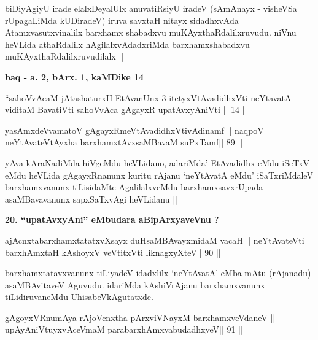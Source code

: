 \begin{artha}
biDiyAgiyU irade elalxDeyalUlx anuvatiRsiyU iradeV (sAmAnayx - visheVSa rUpagaLiMda kUDiradeV) iruva savxtaH nitayx sidadhxvAda Atamxvasutxvinalilx barxhamx shabadxvu muKAyxthaRdalilxruvudu. niVnu heVLida athaRdalilx hAgilalxvAdadxriMda barxhamxshabadxvu muKAyxthaRdalilxruvudilalx ||
\end{artha} 

\begin{center}
{\large\textbf{baq - a. 2, bArx. 1, kaMDike 14}}
\end{center}

\begin{shl}
``sahoVvAcaM jAtashaturxH EtAvanUnx 3 itetyxVtAvadidhxVti
neYtavatA viditaM BavatiVti sahoVvAca gAgayxR
upatAvxyAniVti || 14 ||
\end{shl}

\begin{shl}
yasAmxdeVvamatoV gAgayxRmeVtAvadidhxVtivAdinamf ||
naqpoV neYtAvateVtAyxha barxhamxtAvxsaMBavaM suPxTamf\hfill || 89 ||
\end{shl}

\begin{artha}
yAva kAraNadiMda hiVgeMdu heVLidano, adariMda' EtAvadidhx eMdu iSeTxV eMdu heVLida gAgayxRnanunx kuritu rAjanu `neYtAvatA eMdu' iSaTxriMdaleV barxhamxvanunx tiLisidaMte AgalilalxveMdu barxhamxsavxrUpada asaMBavavanunx sapxSaTxvAgi heVLidanu ||
\end{artha}

\begin{artha}
{\bf 20. ``upatAvxyAni'' eMbudara aBipArxyaveVnu ?}
\end{artha} 

\begin{shl}
ajAcnxtabarxhamxtatatxvXsayx duHsaMBAvayxmidaM vacaH ||
neYtAvateVti barxhAmxtaH kAshoyxV veVtitxVti liknagxyXteV\hfill || 90 ||
\end{shl}

\begin{artha}
barxhamxtatavxvanunx tiLiyadeV idadxlilx `neYtAvatA' eMba mAtu (rAjanadu) asaMBAvitaveV Aguvudu. idariMda kAshiVrAjanu barxhamxvanunx tiLidiruvaneMdu UhisabeVkAgutatxde.
\end{artha}

\begin{shl}
gAgoyxVR\s numAya rAjoVcnx\s tha pArxviVNayxM barxhamxveVdaneV ||
upAyAniVtuyxvAceVmaM parabarxhAmxvabudadhxyeV\hfill || 91 ||
\end{shl}

